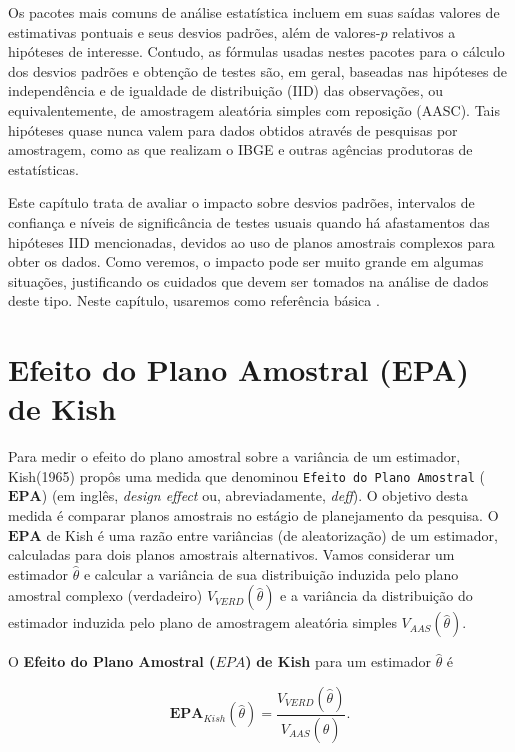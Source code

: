 \documentclass[]{book}
\theoremstyle{definition}
\theoremstyle{definition}
\theoremstyle{definition}
\theoremstyle{remark}
\let\BeginKnitrBlock\begin \let\EndKnitrBlock\end
\begin{document}
Os pacotes mais comuns de análise estatística incluem em suas saídas
valores de estimativas pontuais e seus desvios padrões, além de
valores-\(p\) relativos a hipóteses de interesse. Contudo, as fórmulas
usadas nestes pacotes para o cálculo dos desvios padrões e obtenção de
testes são, em geral, baseadas nas hipóteses de independência e de
igualdade de distribuição (IID) das observações, ou equivalentemente, de
amostragem aleatória simples com reposição (AASC). Tais hipóteses quase
nunca valem para dados obtidos através de pesquisas por amostragem, como
as que realizam o IBGE e outras agências produtoras de estatísticas.

Este capítulo trata de avaliar o impacto sobre desvios padrões,
intervalos de confiança e níveis de significância de testes usuais
quando há afastamentos das hipóteses IID mencionadas, devidos ao uso de
planos amostrais complexos para obter os dados. Como veremos, o impacto
pode ser muito grande em algumas situações, justificando os cuidados que
devem ser tomados na análise de dados deste tipo. Neste capítulo,
usaremos como referência básica \citep{Sk89a}.

\section{Efeito do Plano Amostral (EPA) de
Kish}\label{efeito-do-plano-amostral-epa-de-kish}

Para medir o efeito do plano amostral sobre a variância de um estimador,
Kish(1965) propôs uma medida que denominou
\texttt{Efeito\ do\ Plano\ Amostral} (\(\mathbf{EPA}\)) (em inglês,
\emph{design effect} ou, abreviadamente, \emph{deff}). O objetivo desta
medida é comparar planos amostrais no estágio de planejamento da
pesquisa. O \(\mathbf{EPA}\) de Kish é uma razão entre variâncias (de
aleatorização) de um estimador, calculadas para dois planos amostrais
alternativos. Vamos considerar um estimador \(\hat{\theta}\) e calcular
a variância de sua distribuição induzida pelo plano amostral complexo
(verdadeiro) \(V_{VERD}\left( \hat{\theta}\right)\) e a variância da
distribuição do estimador induzida pelo plano de amostragem aleatória
simples \(V_{AAS}\left(\hat{\theta}\right)\).

\BeginKnitrBlock{definition}
\protect\hypertarget{def:unnamed-chunk-2}{}{\label{def:unnamed-chunk-2} }O
\textbf{Efeito do Plano Amostral (\(EPA\))} \textbf{de Kish} para um
estimador \(\hat{\theta}\) é
\EndKnitrBlock{definition}

\begin{equation}
\mathbf{EPA}_{Kish}\left( \hat{\theta}\right) =\frac{V_{VERD}\left( \hat{\theta}\right) }{V_{AAS}\left( \hat{\theta}\right) }. \label{eq:epa1} \end{equation}
\end{document}
